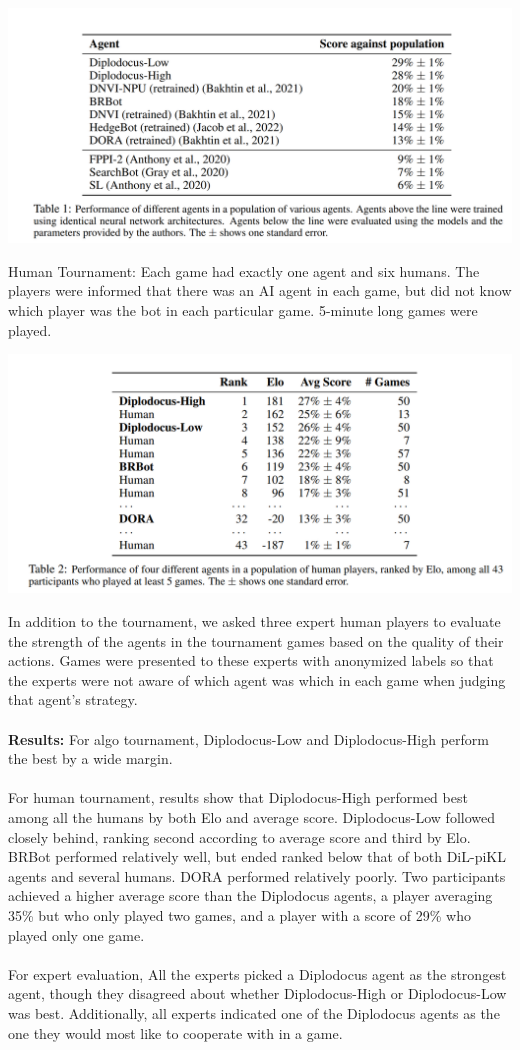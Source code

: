 \documentclass[12pt]{article}
\begin{document}
\begin{center}
  \includegraphics*[scale = 0.7]{table22.png}
\end{center}
Human Tournament: Each game had exactly one agent and six humans. The players were informed that there was an AI agent in each game, but did not know which player was the bot in each particular game. 5-minute long games were played.
\begin{center}
  \includegraphics*[scale = 0.7]{table23.png}
\end{center}
In addition to the tournament, we asked three expert human players to evaluate the strength of the agents in the tournament games based on the quality of their actions. Games were presented to these experts with anonymized labels so that the experts were not aware of which agent was which in each game when judging that agent's strategy.\\
\\
\textbf{Results:}
For algo tournament,  Diplodocus-Low and Diplodocus-High perform the best by a wide margin.\\
\\
For human tournament, results show that Diplodocus-High performed best among all the humans by both Elo and average score. Diplodocus-Low followed closely behind, ranking second according to average score
and third by Elo. BRBot performed relatively well, but ended ranked below that of both DiL-piKL agents and several humans. DORA performed relatively poorly. Two participants achieved a higher average score than the Diplodocus agents, a player averaging 35\% but who only played two games, and a player with a score of 29\% who played only one game.\\
\\
For expert evaluation, All the experts picked a Diplodocus agent as
the strongest agent, though they disagreed about whether Diplodocus-High or Diplodocus-Low was
best. Additionally, all experts indicated one of the Diplodocus agents as the one they would most like to cooperate with in a game.
\end{document}
